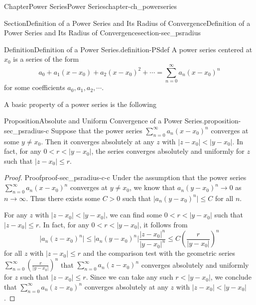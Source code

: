 \documentclass[oneside,10pt,]{book}
\numberwithin{equation}{section}
\newcommand{\lt}{<}
\newcommand{\gt}{>}
\begin{document}
\begin{chapterptx}{Chapter}{Power Series}{}{Power Series}{}{}{chapter-ch_powerseries}
\renewcommand*{\chaptername}{Chapter}
%
%
\typeout{************************************************}
\typeout{************************************************}
%
\begin{sectionptx}{Section}{Definition of a Power Series and Its Radius of Convergence}{}{Definition of a Power Series and Its Radius of Convergence}{}{}{section-sec_psradius}
\begin{definition}{Definition}{Definition of a Power Series.}{definition-PSdef}%
 A power series centered at \(x_{0}\) is a series of the form%
\begin{equation*}
a_{0}+a_{1}(x-x_{0})+a_{2}(x-x_{0})^{2}+\cdots =\sum_{n=0}^{\infty} a_{n}(x-x_{0})^{n}
\end{equation*}
for some coefficients \(a_{0}, a_{1}, a_{2}, \cdots\).\end{definition}
 A basic property of a power series is the following \begin{proposition}{Proposition}{Absolute and Uniform Convergence of a Power Series.}{}{proposition-sec_psradius-c}%
Suppose that the power series \(\sum_{n=0}^{\infty} a_{n}(x-x_{0})^{n}\) converges at some \(y\ne x_{0}\). Then it converges absolutely at any \(z\) with \(|z-x_{0}| \lt |y-x_{0}|\). In fact, for any \(0 \lt r \lt |y-x_{0}|\), the series converges absolutely and uniformly for \(z\) such that \(|z-x_{0}|\le r\).\end{proposition}
\begin{proof}{Proof}{}{proof-sec_psradius-c-c}
Under the assumption that the power series \(\sum_{n=0}^{\infty} a_{n}(x-x_{0})^{n}\) converges at  \(y\ne x_{0}\), we know that \(a_{n}(y-x_{0})^{n} \to 0\) as \(n\to \infty\). Thus there exists some \(C\gt 0\) such that \(\vert a_{n}(y-x_{0})^{n}\vert \le C\) for all \(n\).%
\par
For any \(z\) with \(|z-x_{0}| \lt |y-x_{0}|\), we can find some \(0 \lt r \lt |y-x_{0}|\) such that \(|z-x_{0}|\le r \).  In fact, for any \(0 \lt r \lt |y-x_{0}|\),  it follows from%
\begin{equation*}
\vert a_{n}( z-x_{0})^{n}\vert \le \vert a_{n} (y-x_{0})^{n} \vert \frac{\vert z-x_{0}\vert^{n}}{\vert y-x_{0}\vert^{n}}  \le
C \left(\frac{r}{\vert y-x_{0}\vert}\right)^{n}
\end{equation*}
for all \(z\) with \(|z-x_{0}| \le r\) and the comparison test with the geometric series \(\sum_{n=0}^{\infty} \left(\frac{r}{\vert y-x_{0}\vert}\right)^{n}\) that \(\sum_{n=0}^{\infty} a_{n}(z-x_{0})^{n}\) converges absolutely and uniformly for \(z\) such that \(|z-x_{0}|\le r\). Since we can take any such \(r \lt |y-x_{0}|\), we conclude that \(\sum_{n=0}^{\infty} a_{n}(z-x_{0})^{n}\) converges absolutely at any \(z\) with \(|z-x_{0}| \lt |y-x_{0}|\).%

\end{proof}
\end{sectionptx}
\end{chapterptx}
\end{document}
